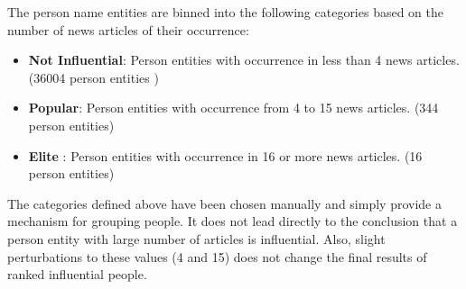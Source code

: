 The person name entities are binned into the following categories based on the number of news articles of their occurrence:
\begin{itemize}
 \item \textbf{Not Influential}: Person entities with occurrence in less than 4 news articles. (36004 person entities )
\item \textbf{Popular}: Person entities with occurrence from 4 to 15 news articles. (344 person entities) 
\item \textbf{Elite} : Person entities with occurrence in 16 or more news articles. (16 person entities)
\end{itemize}
The categories defined above have been chosen manually and simply provide a mechanism for grouping people. It does not lead directly to the conclusion that a person entity with large number of articles is influential. Also, slight perturbations to these values (4 and 15) does not change the final results of ranked influential people.


